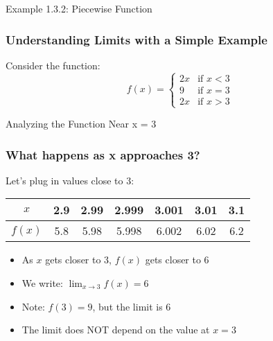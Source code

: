 \documentclass[aspectratio=169]{beamer}
\newcommand{\limx}[2]{\lim_{x \to #1} #2}
\begin{document}
\begin{frame}{Example 1.3.2: Piecewise Function}
\frametitle{Understanding Limits with a Simple Example}

\begin{block}{Consider the function:}
$$f(x) = \begin{cases}
2x & \text{if } x < 3 \\
9 & \text{if } x = 3 \\
2x & \text{if } x > 3
\end{cases}$$
\end{block}

\begin{center}
\end{center}

\end{frame}

\begin{frame}{Analyzing the Function Near x = 3}
\frametitle{What happens as x approaches 3?}

\begin{block}{Let's plug in values close to 3:}
\begin{center}
\begin{tabular}{|c|c|c|c|c|c|c|}
\hline
$x$ & 2.9 & 2.99 & 2.999 & 3.001 & 3.01 & 3.1 \\
\hline
$f(x)$ & 5.8 & 5.98 & 5.998 & 6.002 & 6.02 & 6.2 \\
\hline
\end{tabular}
\end{center}
\end{block}

\begin{itemize}
\item As $x$ gets closer to 3, $f(x)$ gets closer to 6
\item We write: $\limx{3}{f(x)} = 6$
\item Note: $f(3) = 9$, but the limit is 6
\item The limit does NOT depend on the value at $x = 3$
\end{itemize}

\end{frame}
\end{document}
